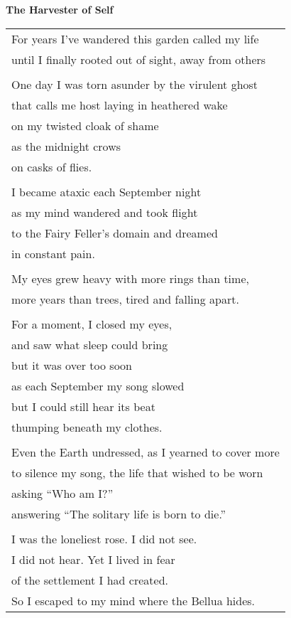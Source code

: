 \documentclass{article}
\begin{document}
\begin{center}
\textbf{The Harvester of Self} \\
\vspace*{2ex}
\begin{tabular}{l}
For years I've wandered this garden called my life \\
until I finally rooted out of sight, away from others\\
\\
One day I was torn asunder by the virulent ghost \\
that calls me host laying in heathered wake \\
on my twisted cloak of shame \\
as the midnight crows \\
on casks of flies. \\
\\
I became ataxic each September night \\
as my mind wandered and took flight \\
to the Fairy Feller's domain and dreamed \\
in constant pain. \\
\\
My eyes grew heavy with more rings than time, \\
more years than trees, tired and falling apart. \\
\\
For a moment, I closed my eyes, \\
and saw what sleep could bring \\
but it was over too soon \\
as each September my song slowed \\
but I could still hear its beat \\
thumping beneath my clothes. \\
\\
Even the Earth undressed, as I yearned to cover more \\
to silence my song, the life that wished to be worn \\
asking ``Who am I?'' \\
answering ``The solitary life is born to die.'' \\
\\
I was the loneliest rose.  I did not see. \\
I did not hear.  Yet I lived in fear \\
of the settlement I had created. \\
So I escaped to my mind where the Bellua hides. \\

\end{tabular}
\end{center}
\end{document}
